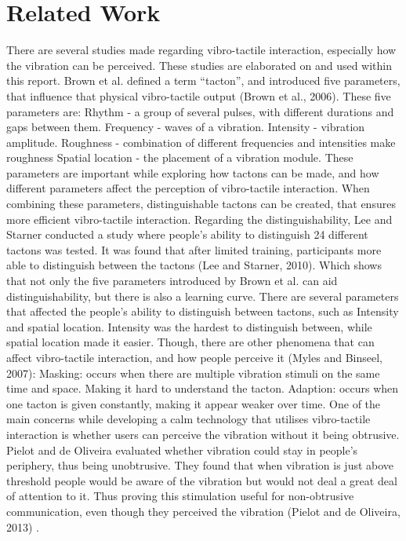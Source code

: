 \documentclass{sigchi}
\begin{document}
\section{Related Work}
There are several studies made regarding vibro-tactile interaction, especially how the vibration can be perceived. These studies are elaborated on and used within this report.  Brown et al. defined a term “tacton”, and introduced five parameters, that influence that physical vibro-tactile output (Brown et al., 2006). These five parameters are:
\newline
\newline
Rhythm - a group of several pulses, with different durations and gaps between them.   
Frequency - waves of a vibration. 
Intensity - vibration amplitude. 
Roughness - combination of different frequencies and intensities make roughness 
Spatial location - the placement of a vibration module.  
\newline
\newline 
These parameters are important while exploring how tactons can be made, and how different parameters affect the perception of vibro-tactile interaction. When combining these parameters, distinguishable tactons can be created, that ensures more efficient vibro-tactile interaction. Regarding the distinguishability, Lee and Starner conducted a study where people's ability to distinguish 24 different tactons was tested. It was found that after limited training, participants more able to distinguish between the tactons (Lee and Starner, 2010). Which shows that not only the five parameters introduced by Brown et al. can aid distinguishability, but there is also a learning curve. 
\newline
\newline
There are several parameters that affected the people's ability to distinguish between tactons, such as Intensity and spatial location. Intensity was the hardest to distinguish between, while spatial location made it easier. Though, there are other phenomena that can affect vibro-tactile interaction, and how people perceive it (Myles and Binseel, 2007): 
\newline
\newline 
Masking: occurs when there are multiple vibration stimuli on the same time and space. Making it hard to understand the tacton. 
Adaption: occurs when one tacton is given constantly, making it appear weaker over time. 
\newline
\newline 
One of the main concerns while developing a calm technology that utilises vibro-tactile interaction is whether users can perceive the vibration without it being obtrusive. Pielot and de Oliveira evaluated whether vibration could stay in people's periphery, thus being unobtrusive. They found that when vibration is just above threshold people would be aware of the vibration but would not deal a great deal of attention to it. Thus proving this stimulation useful for non-obtrusive communication, even though they perceived the vibration (Pielot and de Oliveira, 2013) .  
\end{document}
